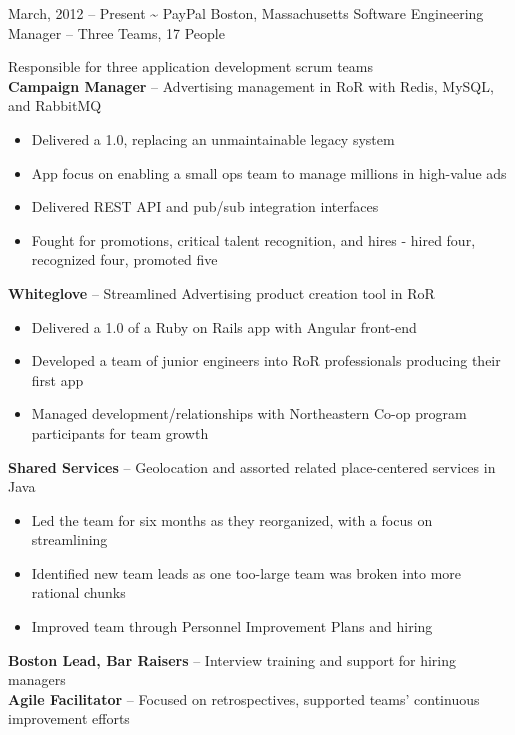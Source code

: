 \documentclass[]{friggeri-cv}
\begin{document}
\begin{entrylist}
  \entryalt
    {March, 2012 -- Present}
    {\textbf{\textasciitilde} PayPal}
    {Boston, Massachusetts}
    {Software Engineering Manager -- Three Teams, 17 People}
    {Responsible for three application development scrum teams \\
      \textbf{Campaign Manager} -- Advertising management in RoR with Redis, MySQL,
      and RabbitMQ
    \begin{itemize}
      \item Delivered a 1.0, replacing an unmaintainable legacy system
      \item App focus on enabling a small ops team to manage millions in
        high-value ads
      \item Delivered REST API and pub/sub integration interfaces
      \item Fought for promotions, critical talent recognition, and hires - hired four, recognized four, promoted five
    \end{itemize}
      \textbf{Whiteglove} -- Streamlined Advertising product creation tool in RoR
    \begin{itemize}
      \item Delivered a 1.0 of a Ruby on Rails app with Angular front-end
      \item Developed a team of junior engineers into RoR professionals producing their first app
      \item Managed development/relationships with Northeastern Co-op program
        participants for team growth
    \end{itemize} 
      \textbf{Shared Services} -- Geolocation and assorted related place-centered
      services in Java
    \begin{itemize}
      \item Led the team for six months as they reorganized, with a focus on
        streamlining
      \item Identified new team leads as one too-large team was broken
        into more rational chunks
      \item Improved team through Personnel Improvement Plans and hiring
    \end{itemize}
    \textbf{Boston Lead, Bar Raisers} -- Interview training and support for hiring managers\\
    \textbf{Agile Facilitator} -- Focused on retrospectives, supported teams' continuous improvement efforts}
    

\end{entrylist}
\end{document}
